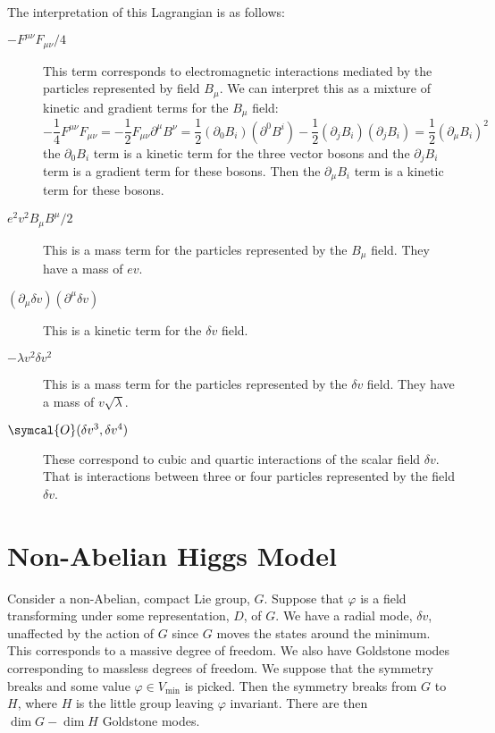 \documentclass[fleqn]{NotesClass}
\newcommand{\order}{\symcal{O}}
\begin{document}
    The interpretation of this Lagrangian is as follows:
    \begin{description}
        \item[\(-F^{\mu\nu}F_{\mu\nu}/4\)] This term corresponds to electromagnetic interactions mediated by the particles represented by field \(B_\mu\).
        We can interpret this as a mixture of kinetic and gradient terms for the \(B_\mu\) field:
        \begin{equation}
            -\frac{1}{4}F^{\mu\nu} F_{\mu\nu} = -\frac{1}{2}F_{\mu\nu}\partial^\mu B^\nu = \frac{1}{2}(\partial_0 B_i)(\partial^0 B^i) - \frac{1}{2}(\partial_j B_i)(\partial_j B_i) = \frac{1}{2}(\partial_\mu B_i)^2
        \end{equation}
        the \(\partial_0 B_i\) term is a kinetic term for the three vector bosons and the \(\partial_j B_i\) term is a gradient term for these bosons.
        Then the \(\partial_\mu B_i\) term is a kinetic term for these bosons.
        \item[\(e^2v^2 B_\mu B^\mu/2\)] This is a mass term for the particles represented by the \(B_\mu\) field.
        They have a mass of \(ev\).
        \item[\((\partial_\mu \delta v)(\partial^\mu \delta v)\)] This is a kinetic term for the \(\delta v\) field.
        \item[\(-\lambda v^2 \delta v^2\)] This is a mass term for the particles represented by the \(\delta v\) field.
        They have a mass of \(v\sqrt{\lambda}\).
        \item[\(\order(\delta v^3, \delta v^4)\)] These correspond to cubic and quartic interactions of the scalar field \(\delta v\).
        That is interactions between three or four particles represented by the field \(\delta v\).
    \end{description}

    \section{Non-Abelian Higgs Model}
    Consider a non-Abelian, compact Lie group, \(G\).
    Suppose that \(\varphi\) is a field transforming under some representation, \(D\), of \(G\).
    We have a radial mode, \(\delta v\), unaffected by the action of \(G\) since \(G\) moves the states around the minimum.
    This corresponds to a massive degree of freedom.
    We also have Goldstone modes corresponding to massless degrees of freedom.
    We suppose that the symmetry breaks and some value \(\varphi \in V_{\min}\) is picked.
    Then the symmetry breaks from \(G\) to \(H\), where \(H\) is the little group leaving \(\varphi\) invariant.
    There are then \(\dim G - \dim H\) Goldstone modes.
    
\end{document}
